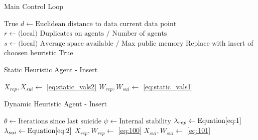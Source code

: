 \documentclass{UoYCSproject}
\begin{document}
\begin{algorithm}
\caption{Main Control Loop}
\label{Agent_Control_Loop1}
\begin{algorithmic}[1]
\State {}
\State
{}
\State {}
\State \Return True
\EndIf
\State
\State $d \gets \text{Euclidean distance to data current data point}$
\State $r \gets \text{(local) Duplicates on agents / Number of agents}$
\State $s \gets \text{(local) Average space available / Max public memory}$
\State
\State Replace with insert of choosen heuristic
\State
{}
\State {}
\EndIf
\State
{}
\State {}
\EndIf
\State
\State {}
\State
\State \Return True
\EndProcedure
\end{algorithmic}
\end{algorithm}

\begin{algorithm}
\caption{Static Heuristic Agent - Insert}
\label{Agent_Control_Loop2}
\begin{algorithmic}[1]
\State $X_{rep}, X_{sui} \gets $ \ref{eq:static_vals2}
\State $W_{rep}, W_{sui} \gets $ \ref{eq:static_vals1}
\end{algorithmic}
\end{algorithm}

\begin{algorithm}
\caption{Dynamic Heuristic Agent - Insert}
\label{Agent_Control_Loop3}
\begin{algorithmic}[1]
\State $\theta \gets \text{Iterations since last suicide}$
\State $\psi \gets \text{Internal stability}$
\State $\lambda_{rep} \gets \text{Equation} \ref{eq:1}$
\State $\lambda_{sui}  \gets \text{Equation} \ref{eq:2}$
\State $X_{rep}, W_{rep} \gets $ \ref{eq:100}
\State $X_{sui}, W_{sui} \gets $ \ref{eq:101}
\end{algorithmic}
\end{algorithm}
\end{document}
